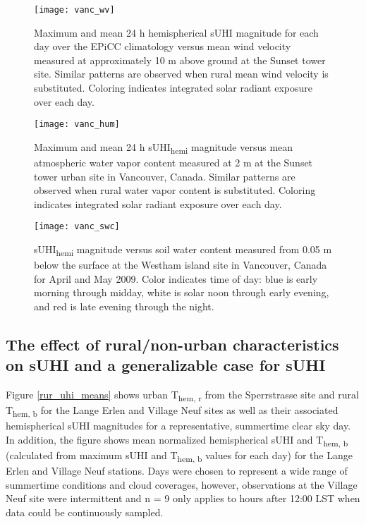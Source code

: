 \begin{bibunit}
\begin{figure}[H]
	\centering
	\texttt{[image: vanc\_wv]}
	\caption{Maximum and mean 24 \si{\hour} hemispherical sUHI magnitude for each day over the EPiCC climatology versus mean wind velocity measured at approximately 10 \si{\meter} above ground at the Sunset tower site. Similar patterns are observed when rural mean wind velocity is substituted. Coloring indicates integrated solar radiant exposure over each day.}
	\label{vanc_wv}
\end{figure}

\begin{figure}[H]
	\centering
	\texttt{[image: vanc\_hum]}
	\caption{Maximum and mean 24 \si{\hour} sUHI\textsubscript{hemi} magnitude versus mean atmospheric water vapor content measured at 2 \si{\meter} at the Sunset tower urban site in Vancouver, Canada. Similar patterns are observed when rural water vapor content is substituted. Coloring indicates integrated solar radiant exposure over each day.}
	\label{vanc_hum}
\end{figure}

\begin{figure}[H]
	\centering
	\texttt{[image: vanc\_swc]}
	\caption{sUHI\textsubscript{hemi} magnitude versus soil water content measured from 0.05 \si{\meter} below the surface at the Westham island site in Vancouver, Canada for April and May 2009. Color indicates time of day: blue is early morning through midday, white is solar noon through early evening, and red is late evening through the night.}
	\label{vanc_swc}
\end{figure}

\pagebreak

\subsection{The effect of rural/non-urban characteristics on sUHI and a generalizable case for sUHI}

Figure \ref{rur_uhi_means} shows urban T\textsubscript{hem, r} from the Sperrstrasse site and rural T\textsubscript{hem, b} for the Lange Erlen and Village Neuf sites as well as their associated hemispherical sUHI magnitudes for a representative, summertime clear sky day. In addition, the figure shows mean normalized hemispherical sUHI and T\textsubscript{hem, b} (calculated from maximum sUHI and T\textsubscript{hem, b} values for each day) for the Lange Erlen and Village Neuf stations. Days were chosen to represent a wide range of summertime conditions and cloud coverages, however, observations at the Village Neuf site were intermittent and n = 9 only applies to hours after 12:00 LST when data could be continuously sampled.


\end{bibunit}
